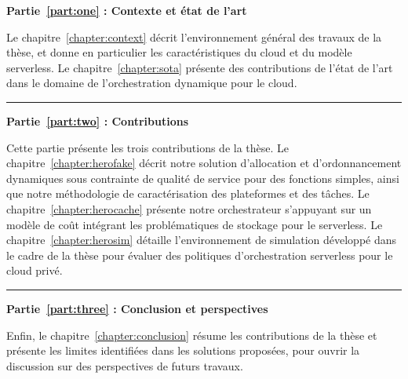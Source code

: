 \textbf{Partie~\ref{part:one} : Contexte et état de l'art}

Le chapitre~\ref{chapter:context} décrit l'environnement général des travaux de la thèse, et donne en particulier les caractéristiques du cloud et du modèle serverless. Le chapitre~\ref{chapter:sota} présente des contributions de l'état de l'art dans le domaine de l'orchestration dynamique pour le cloud.

\begin{center}
    \rule{4cm}{0.4pt}
\end{center}

\textbf{Partie~\ref{part:two} : Contributions}

Cette partie présente les trois contributions de la thèse. Le chapitre~\ref{chapter:herofake} décrit notre solution d'allocation et d'ordonnancement dynamiques sous contrainte de qualité de service pour des fonctions simples, ainsi que notre méthodologie de caractérisation des plateformes et des tâches. Le chapitre~\ref{chapter:herocache} présente notre orchestrateur s'appuyant sur un modèle de coût intégrant les problématiques de stockage pour le serverless. Le chapitre~\ref{chapter:herosim} détaille l'environnement de simulation développé dans le cadre de la thèse pour évaluer des politiques d'orchestration serverless pour le cloud privé.

\begin{center}
    \rule{4cm}{0.4pt}
\end{center}

\textbf{Partie~\ref{part:three} : Conclusion et perspectives}

Enfin, le chapitre~\ref{chapter:conclusion} résume les contributions de la thèse et présente les limites identifiées dans les solutions proposées, pour ouvrir la discussion sur des perspectives de futurs travaux.

